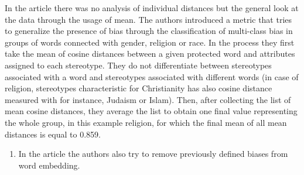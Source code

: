 \documentclass[12pt,]{book}
\providecommand{\tightlist}{%
  \setlength{\itemsep}{0pt}\setlength{\parskip}{0pt}}
\begin{document}
\begin{table}

\caption{\label{tab:religionTableHeadEarly}Head of the religion dataset.}
\centering
{}
\end{table}

\normalsize

\pagebreak 

In the article there was no analysis of individual distances but the
general look at the data through the usage of mean. The authors
introduced a metric that tries to generalize the presence of bias
through the classification of multi-class bias in groups of words
connected with gender, religion or race. In the process they first take
the mean of cosine distances between a given protected word and
attributes assigned to each stereotype. They do not differentiate
between stereotypes associated with a word and stereotypes associated
with different words (in case of religion, stereotypes characteristic
for Christianity has also cosine distance measured with for instance,
Judaism or Islam). Then, after collecting the list of mean cosine
distances, they average the list to obtain one final value representing
the whole group, in this example religion, for which the final mean of
all mean distances is equal to 0.859.

\begin{enumerate}
\def\labelenumi{\arabic{enumi}.}
\setcounter{enumi}{2}
\tightlist
\item
  In the article the authors also try to remove previously defined
  biases from word embedding.
\end{enumerate}
\end{document}
